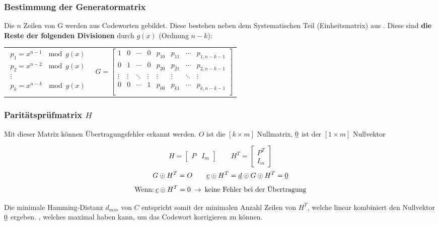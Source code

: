 \documentclass[a4paper]{article}
\begin{document}
\begin{twocolumn}
\subsubsection{Bestimmung der Generatormatrix}
Die $n$ Zeilen von G werden aus Codeworten gebildet. 
Diese bestehen neben dem Systematischen Teil (Einheitsmatrix) aus . 
Diese sind \textbf{die Reste der folgenden Divisionen} durch $g(x)$ (Ordnung $n-k$):

\begin{tabularx}{\columnwidth}{cc}
$$\begin{array}{c}
  p_1 = x^{n-1} \: \mod g(x) \\
  p_2 = x^{n-2} \: \mod g(x) \\
  \vdots  \\
  p_k = x^{n-k} \: \mod g(x) \\
\end{array}$$ &
$$G=\left[ \begin{array}{llllllll} 
  1 & 0 & \cdots & 0 & p_{10} & p_{11} & \cdots & p_{1,n-k-1} \\
  0 & 1 & \cdots & 0 & p_{20} & p_{21} & \cdots & p_{2,n-k-1} \\
  \vdots & \vdots & \ddots & \vdots & \vdots & \vdots & \ddots & \vdots \\
  0 & 0 & \cdots & 1 & p_{k0} & p_{k1} & \cdots & p_{k,n-k-1} \\
\end{array} \right]$$
\end{tabularx}

\subsubsection{Paritätsprüfmatrix $H$}
Mit dieser Matrix können Übertragungsfehler erkannt werden. $O$ ist die $[k \times m]$ 
Nullmatrix, $\underline{0}$ ist der $[1 \times m]$ Nullvektor

$$H = \left[ \begin{array}{ll} P & I_m \end{array} \right] \qquad H^T = 
\left[ \begin{array}{l} P^T \\ I_m \end{array} \right]$$
$$G \odot H^T = O \qquad \underline{c} \odot H^T = \underline{d} \odot G \odot H^T = \underline{0}$$
$$\text{Wenn:} \: \underline{c} \odot H^T = 0 \: \rightarrow \: \text{keine Fehler bei der Übertragung}$$

Die minimale Hamming-Distanz $d_{min}$ von $C$ entspricht somit der minimalen Anzahl Zeilen 
von $H^T$, welche linear kombiniert den Nullvektor $\underline{0}$ ergeben. 
, welches maximal  haben kann, um das Codewort korrigieren zu können.


\end{twocolumn}
\end{document}
